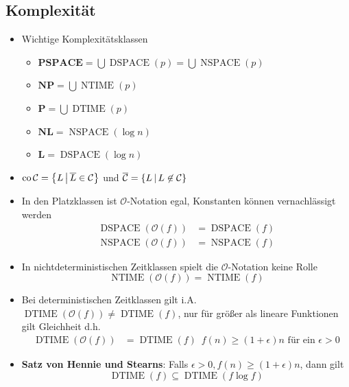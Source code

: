 \documentclass[landscape, 8pt, a4paper]{extarticle}
\newcommand{\poly}{\textbf{P}}
\newcommand{\npoly}{\textbf{NP}}
\newcommand{\set}[2]{\ensuremath\left\{ #1 \,\middle|\, #2 \right\}}
\begin{document}
\begin{multicols}{3}
	\section{Komplexität}
	\begin{itemize}
		\item Wichtige Komplexitätsklassen \begin{itemize}
			\item $\textbf{PSPACE}=\bigcup \operatorname{DSPACE}(p)=\bigcup \operatorname{NSPACE}(p)$
			\item $\npoly = \bigcup \operatorname{NTIME}(p)$
			\item $\poly = \bigcup \operatorname{DTIME}(p)$
			\item $\textbf{NL}=\operatorname{NSPACE}(\log n)$
			\item $\textbf{L}=\operatorname{DSPACE}(\log n)$
		\end{itemize}
		\item $\operatorname{co}\mathcal C=\set{L}{\overline L\in \mathcal C}$ und $\overline{\mathcal C}=\set{L}{L\not \in \mathcal C}$
		\item In den Platzklassen ist $\mathcal O$-Notation egal, Konstanten können vernachlässigt werden
		\begin{align*}
			\operatorname{DSPACE}(\mathcal O(f))&=\operatorname{DSPACE}(f)\\
			\operatorname{NSPACE}(\mathcal O(f))&=\operatorname{NSPACE}(f)
		\end{align*}
		\item In nichtdeterministischen Zeitklassen spielt die $\mathcal O$-Notation keine Rolle
		\begin{equation*}
			\operatorname{NTIME}(\mathcal O(f))=\operatorname{NTIME}(f)
		\end{equation*}
		\item Bei deterministischen Zeitklassen gilt i.A. $\operatorname{DTIME}(\mathcal O(f))\not=\operatorname{DTIME}(f)$, nur für größer als lineare Funktionen gilt Gleichheit d.h.
		\begin{align*}
			\operatorname{DTIME}(\mathcal O(f))&=\operatorname{DTIME}(f) \enspace f(n)\geq (1+\epsilon)n\text{ für ein }\epsilon>0
		\end{align*}
		\item \textbf{Satz von Hennie und Stearns}: Falls $\epsilon>0, f(n)\geq (1+\epsilon)n$, dann gilt
		\begin{equation*}
			\operatorname{DTIME}(f)\subseteq\operatorname{DTIME}(f\log f)
		\end{equation*}

\end{itemize}
\end{multicols}
\end{document}
